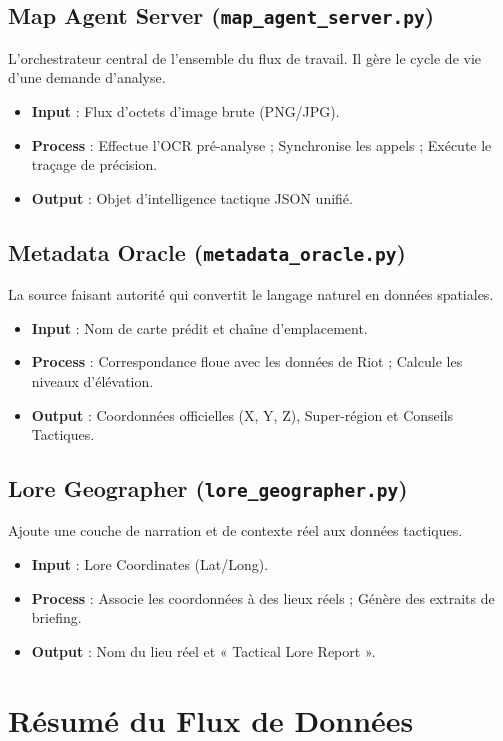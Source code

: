 \documentclass[11pt,a4paper]{article}
\begin{document}
\subsection{Map Agent Server (\texttt{map\_agent\_server.py})}
L'orchestrateur central de l'ensemble du flux de travail. Il gère le cycle de vie d'une demande d'analyse.
\begin{itemize}
    \item \textbf{Input} : Flux d'octets d'image brute (PNG/JPG).
    \item \textbf{Process} : Effectue l'OCR pré-analyse ; Synchronise les appels ; Exécute le traçage de précision.
    \item \textbf{Output} : Objet d'intelligence tactique JSON unifié.
\end{itemize}

\subsection{Metadata Oracle (\texttt{metadata\_oracle.py})}
La source faisant autorité qui convertit le langage naturel en données spatiales.
\begin{itemize}
    \item \textbf{Input} : Nom de carte prédit et chaîne d'emplacement.
    \item \textbf{Process} : Correspondance floue avec les données de Riot ; Calcule les niveaux d'élévation.
    \item \textbf{Output} : Coordonnées officielles (X, Y, Z), Super-région et Conseils Tactiques.
\end{itemize}

\subsection{Lore Geographer (\texttt{lore\_geographer.py})}
Ajoute une couche de narration et de contexte réel aux données tactiques.
\begin{itemize}
    \item \textbf{Input} : Lore Coordinates (Lat/Long).
    \item \textbf{Process} : Associe les coordonnées à des lieux réels ; Génère des extraits de briefing.
    \item \textbf{Output} : Nom du lieu réel et « Tactical Lore Report ».
\end{itemize}

\section{Résumé du Flux de Données}
\end{document}
